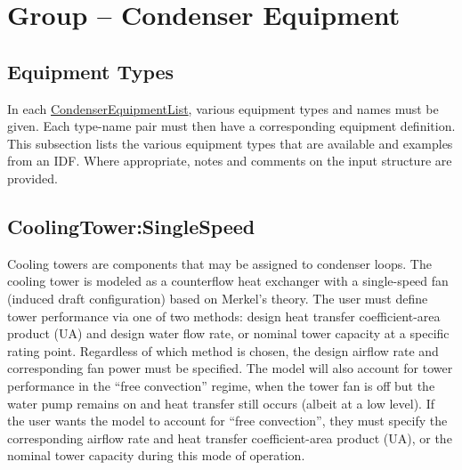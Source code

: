 \section{Group -- Condenser Equipment}\label{group-condenser-equipment}

\subsection{Equipment Types}\label{equipment-types}

In each \hyperref[condenserequipmentlist]{CondenserEquipmentList}, various equipment types and names must be given. Each type-name pair must then have a corresponding equipment definition. This subsection lists the various equipment types that are available and examples from an IDF. Where appropriate, notes and comments on the input structure are provided.

\subsection{CoolingTower:SingleSpeed}\label{coolingtowersinglespeed}

Cooling towers are components that may be assigned to condenser loops. The cooling tower is modeled as a counterflow heat exchanger with a single-speed fan (induced draft configuration) based on Merkel's theory. The user must define tower performance via one of two methods: design heat transfer coefficient-area product (UA) and design water flow rate, or nominal tower capacity at a specific rating point. Regardless of which method is chosen, the design airflow rate and corresponding fan power must be specified. The model will also account for tower performance in the ``free convection'' regime, when the tower fan is off but the water pump remains on and heat transfer still occurs (albeit at a low level). If the user wants the model to account for ``free convection'', they must specify the corresponding airflow rate and heat transfer coefficient-area product (UA), or the nominal tower capacity during this mode of operation.


